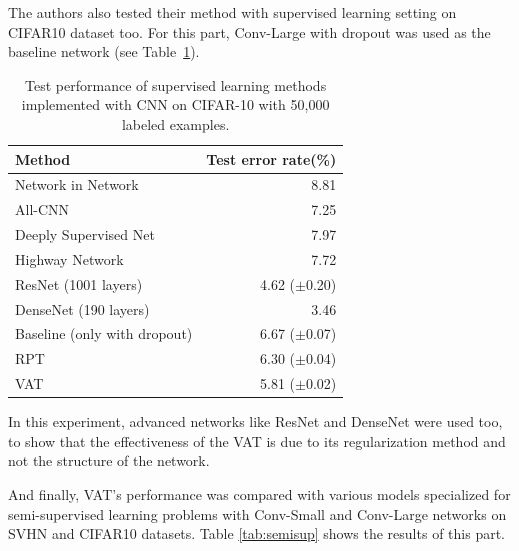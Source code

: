 \documentclass[paper=a4, fontsize=11pt]{scrartcl}
\numberwithin{equation}{section}		%
\numberwithin{figure}{section}			%
\numberwithin{table}{section}				%
\begin{document}
The authors also tested their method with supervised learning setting on CIFAR10 dataset too. For this part, Conv-Large %
with dropout was used as the baseline network (see Table~\ref{tab:ciphar10}).

\begin{table}[H]
\label{tab:ciphar10}
\centering
\caption{Test performance of supervised learning methods
implemented with CNN on CIFAR-10 with 50,000 labeled
examples.}
\label{tab:ciphar10}
\begin{tabular}{l r}
\hline
\hline
Method & Test error rate(\%)\\
\hline
Network in Network & 8.81\\
All-CNN & 7.25\\
Deeply Supervised Net & 7.97\\
Highway Network & 7.72\\
ResNet (1001 layers) & 4.62 (\(\pm\)0.20)\\
DenseNet (190 layers) & 3.46\\
\hline
Baseline (only with dropout) &6.67 (\(\pm\)0.07)\\
RPT &6.30 (\(\pm\)0.04)\\
VAT &5.81 (\(\pm\)0.02)\\
\hline
\hline
\end{tabular}
\end{table}

In this experiment, advanced networks like ResNet and DenseNet were used too, to show that the effectiveness of the VAT is due to its regularization method and not the structure of the network.

And finally, VAT's performance was compared with various models specialized for semi-supervised learning problems with Conv-Small and Conv-Large networks on SVHN and CIFAR10 datasets.
Table \ref{tab:semisup} shows the results of this part.
\end{document}
